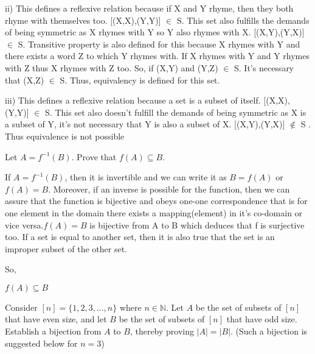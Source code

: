 \documentclass[addpoints]{exam}
\begin{document}
\begin{questions}
\begin{parts}
\begin{solution}
    
    ii) This defines a reflexive relation because if X and Y rhyme, then they both rhyme with themselves too. [(X,X),(Y,Y)] $\in$ S. This set also fulfills the demands of being symmetric as X rhymes with Y so Y also rhymes with X.
    [(X,Y),(Y,X)] $\in$ S. Transitive property is also defined for this because X rhymes with Y and there exists a word Z to which Y rhymes with. If X rhymes with Y and Y rhymes with Z thus X rhymes with Z too. So, if (X,Y) and (Y,Z) $\in$ S. It's necessary that (X,Z) $\in$ S. Thus, equivalency is defined for this set.
 
 
    
    iii) This defines a reflexive relation because a set is a subset of itself. [(X,X),(Y,Y)] $\in$ S. This set also doesn't fulfill the demands of being symmetric as X is a subset of Y, it's not necessary that Y is also a subset of X. [(X,Y),(Y,X)] $\notin$ S . Thus equivalence is not possible
    \end{solution}

\end{parts}

\question[15] Let $A = f^{-1}(B)$. Prove that $f(A) \subseteq B$.
  \begin{solution}
        If $A = f^{-1}(B)$, then it is invertible and we can write it as $B = f(A)$ or $f(A) = B$. Moreover, if an inverse is possible for the function, then we can assure that the function is bijective and obeys one-one correspondence that is for one element in the domain there exists a mapping(element) in it's co-domain or vice versa.$f(A)=B$ is bijective from A to B which deduces that f is surjective too. If a set is equal to another set, then it is also 
        true that the set is an improper subset of the other set.
        
        So,
        \begin{center}
        
        
        $f(A) \subseteq B $
            
        \end{center}
         
        
        
  \end{solution}

\question[15] Consider $[n] = \{1,2,3,...,n\}$ where $n \in \mathbb{N}$. Let $A$ be the set of subsets of $[n]$ that have even size, and let $B$ be the set of subsets of $[n]$ that have odd size. Establish a bijection from $A$ to $B$, thereby proving $|A| = |B|$. (Such a bijection is suggested below for $n = 3$) 


\end{questions}
\end{document}
